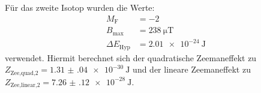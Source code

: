 		Für das zweite Isotop wurden die Werte:
		\begin{align*}
			M_\text{F} &= -2\\
			B_\text{max} &= \SI{238}{\micro\tesla}\\
			\Delta E_\text{Hyp} &= \SI{2.01 e-24}{\joule}
		\end{align*}
		verwendet. Hiermit berechnet sich der quadratische Zeemaneffekt zu $Z_\text{Zee,quad,2} = \SI{1.31(04)e-30}{\joule}$ und der lineare Zeemaneffekt zu $Z_\text{Zee,linear,2} = \SI{7.26(12)e-28}{\joule}$.






	
